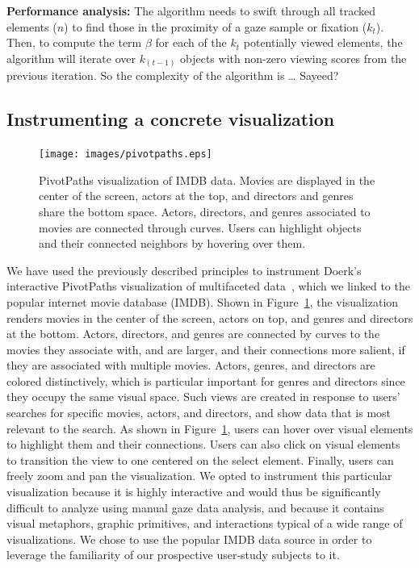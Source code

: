 {\bf Performance analysis:} The algorithm needs to swift through all tracked elements ($n$) to find those in the proximity of a gaze sample or fixation ($k_t$). Then, to compute the term $\beta$ for each of the $k_t$ potentially viewed elements, the algorithm will iterate over $k_(t-1)$ objects with non-zero viewing scores from the previous iteration. So the complexity of the algorithm is … Sayeed?


\subsection{Instrumenting a concrete visualization}

\begin{figure}[htb]
  \centering
  \texttt{[image: images/pivotpaths.eps]}
  \caption{PivotPaths visualization of IMDB data. Movies are displayed in the center of the screen, actors at the top, and directors and genres share the bottom space. Actors, directors, and genres associated to movies are connected through curves. Users can highlight objects and their connected neighbors by hovering over them.}
	\label{fig:pivotpaths}
\end{figure}
We have used the previously described principles to instrument Doerk's interactive PivotPaths visualization of multifaceted data~\cite{dork2012pivotpaths}, which we linked to the popular internet movie database (IMDB). Shown in Figure~\ref{fig:pivotpaths}, the visualization renders movies in the center of the screen, actors on top, and genres and directors at the bottom. Actors, directors, and genres are connected by curves to the movies they associate with, and are larger, and their connections more salient, if they are associated with multiple movies. Actors, genres, and directors are colored distinctively, which is particular important for genres and directors since they occupy the same visual space. Such views are created in response to users' searches for specific movies, actors, and directors, and show data that is most relevant to the search. As shown in Figure~\ref{fig:pivotpaths}, users can hover over visual elements to highlight them and their connections. Users can also click on visual elements to transition the view to one centered on the select element. Finally, users can freely zoom and pan the visualization. 
We opted to instrument this particular visualization because it is highly interactive and would thus be significantly difficult to analyze using manual gaze data analysis, and because it contains visual metaphors, graphic primitives, and interactions typical of a wide range of visualizations. We chose to use the popular IMDB data source in order to leverage the familiarity of our prospective user-study subjects to it.  
